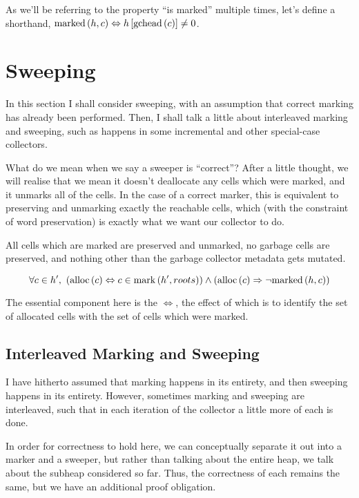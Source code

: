 As we'll be referring to the property ``is marked'' multiple times,
let's define a shorthand, $\mathrm{marked}\left(h, c\right) \Leftrightarrow h\left[\mathrm{gchead}\left(c\right)\right]
\neq 0$.

\section{Sweeping}

In this section I shall consider sweeping, with an assumption that
correct marking has already been performed. Then, I shall talk a
little about interleaved marking and sweeping, such as happens in some
incremental and other special-case collectors.

What do we mean when we say a sweeper is ``correct''? After a little
thought, we will realise that we mean it doesn't deallocate any
\glspl{cell} which were marked, and it unmarks all of the
\glspl{cell}. In the case of a correct marker, this is equivalent to
preserving and unmarking exactly the reachable \glspl{cell}, which
(with the constraint of word preservation) is exactly what we want our
\gls{collector} to do.

\begin{definition}
  All cells which are marked are preserved and unmarked, no garbage
  cells are preserved, and nothing other than the garbage collector
  metadata gets mutated.

  \[\forall c \in h',\ \left(\mathrm{alloc}\left(c\right) \Leftrightarrow c \in
    \mathrm{mark}\left(h', roots\right)\right) \land \left(\mathrm{alloc}\left(c\right) \Rightarrow
    \lnot\mathrm{marked}\left(h, c\right)\right)\]
\end{definition}

The essential component here is the $\iff$, the effect of which is to
identify the set of allocated cells with the set of cells which were
marked.

\subsection{Interleaved Marking and Sweeping}

I have hitherto assumed that marking happens in its entirety, and then
sweeping happens in its entirety. However, sometimes marking and
sweeping are interleaved, such that in each iteration of the collector
a little more of each is done.

In order for correctness to hold here, we can conceptually separate it
out into a marker and a sweeper, but rather than talking about the
entire heap, we talk about the subheap considered so far. Thus, the
correctness of each remains the same, but we have an additional proof
obligation.

